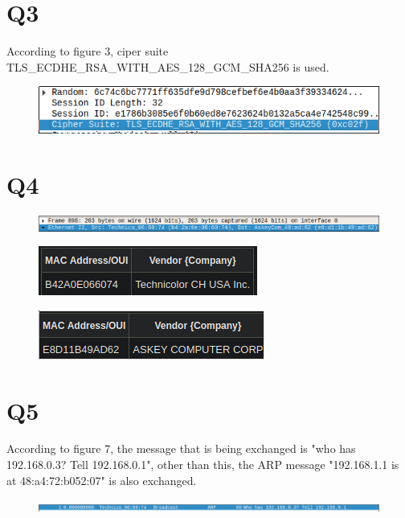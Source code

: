 \documentclass{article}
\begin{document}
\section*{Q3}
According to figure 3, ciper suite TLS\_ECDHE\_RSA\_WITH\_AES\_128\_GCM\_SHA256 is used.\\
\begin{figure}[h!]
\centering
\includegraphics[scale=0.5]{Q3.png}
\caption{}
\end{figure}

\section*{Q4}
\begin{figure}[h!]
\centering
\includegraphics[scale=0.5]{Q4a.png}
\caption{}
\end{figure}

\begin{figure}[h!]
\centering
\includegraphics[scale=0.5]{Q4b.png}
\caption{}
\end{figure}

\begin{figure}[h!]
\centering
\includegraphics[scale=0.5]{Q4c.png}
\caption{}
\end{figure}

\section*{Q5}
According to figure 7, the message that is being exchanged is "who has 192.168.0.3? Tell 192.168.0.1", other than this, the ARP message "192.168.1.1 is at 48:a4:72:b052:07" is also exchanged.\\
\begin{figure}[h!]
\centering
\includegraphics[scale=0.5]{Q5a.png}
\caption{}
\end{figure}
\clearpage
\end{document}
